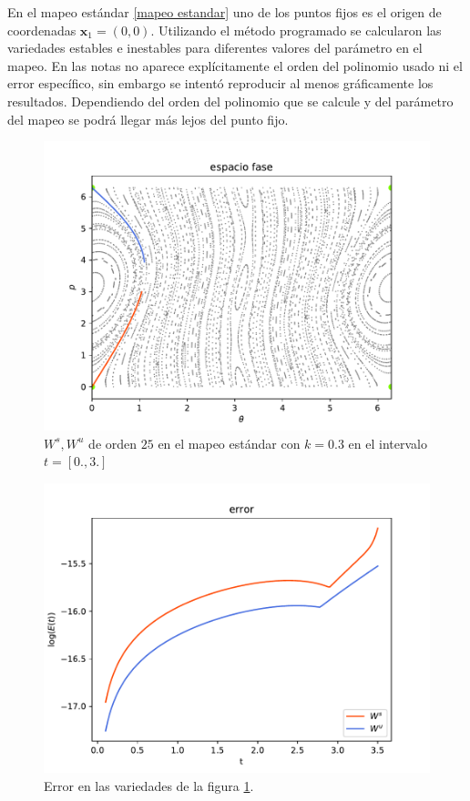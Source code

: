 En el mapeo estándar \eqref{mapeo estandar} uno de los puntos fijos es el origen de coordenadas $\mathbf{x}_{1}=(0,0)$. Utilizando el método programado se calcularon las variedades estables e inestables para diferentes valores del parámetro en el mapeo. En las notas \citep{Mireles} no aparece explícitamente el orden del polinomio usado ni el error específico, sin embargo se intentó reproducir al menos gráficamente los resultados. Dependiendo del orden del polinomio que se calcule y del parámetro del mapeo se podrá llegar más lejos del punto fijo.  
\begin{figure}[H]
 \centering
 \includegraphics[scale=0.7]{k03}
 \caption{\footnotesize $W^{s},W^{u}$ de orden $25$ en el mapeo estándar con $k=0.3$ en el intervalo $t=[0.,3.]$}
 \label{estandar03}
\end{figure}

\begin{figure}[H]
\centering
\includegraphics[scale=0.7]{errork03} 
\caption{Error en las variedades de la figura \ref{estandar03}.}
\label{error est k03}
\end{figure}


